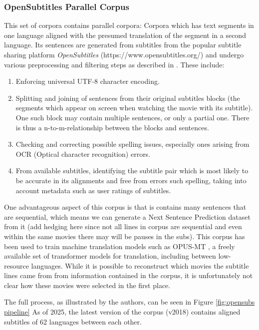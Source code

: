 \subsubsection{OpenSubtitles Parallel Corpus}
This set of corpora contains parallel corpora:
Corpora which has text segments in one language aligned with the presumed translation of the segment in a second language.
Its sentences are generated from subtitles from the popular subtitle sharing platform \textit{OpenSubtitles} (https://www.opensubtitles.org/) and undergo various preprocessing and filtering steps as described in \cite{lisonOpensubtitles2016ExtractingLarge2016}.
These include:
\begin{enumerate}
	\item Enforcing universal UTF-8 character encoding.
	\item
	      Splitting and joining of sentences from their original subtitles blocks (the segments which appear on screen when watching the movie with its subtitle).
	      One such block may contain multiple sentences, or only a partial one.
	      There is thus a n-to-m-relationship between the blocks and sentences.
	\item Checking and correcting possible spelling issues, especially ones arising from OCR (Optical character recognition) errors.
	\item From available subtitles, identifying the subtitle pair which is most likely to be accurate in its alignments and free from errors such spelling, taking into account metadata such as user ratings of subtitles.

\end{enumerate}
One advantageous aspect of this corpus is that is contains many sentences that are sequential, which means we can generate a Next Sentence Prediction dataset from it (add hedging here since not all lines in corpus are sequential and even within the same movies there may will be pauses in the subs).
This corpus has been used to train machine translation models such as OPUS-MT \cite{tiedemannOPUSMTbuildingOpenTranslation2020}, a freely available set of transformer models for translation, including between low-resource languages. 
While it is possible to reconstruct which movies the subtitle lines came from from information contained in the corpus, it is unfortunately not clear how these movies were selected in the first place.


The full process, as illustrated by the authors, can be seen in Figure \ref{fig:opensubs pipeline}
As of 2025, the latest version of the corpus (v2018) contains aligned subtitles of 62 languages between each other.

